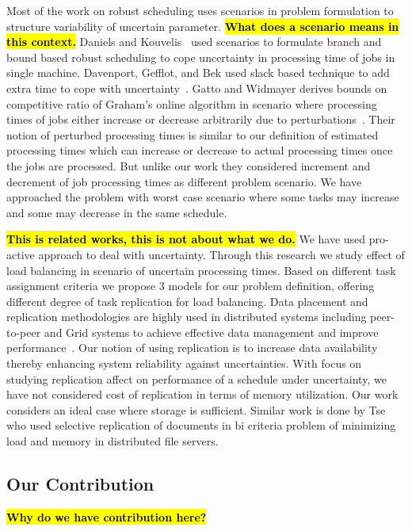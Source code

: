 \documentclass[10pt, conference, compsocconf]{IEEEtran}
\newcommand{\todo}[1]{{\color{red}\textbf{\hl{#1}}\xspace}}
\begin{document}
Most of the work on robust scheduling uses scenarios in problem
formulation to structure variability of uncertain parameter. \todo{What does a scenario means in this context.} Daniels and Kouvelis~\cite{citeulike:8334169} used scenarios to formulate
branch and bound based robust scheduling to cope uncertainty in
processing time of jobs in single machine. Davenport, Gefflot, and Bek
used slack based technique to add extra time to cope with
uncertainty~\cite{Davenport_slack-basedtechniques}. Gatto and Widmayer
derives bounds on competitive ratio of Graham’s online algorithm in
scenario where processing times of jobs either increase or decrease
arbitrarily due to perturbations~\cite{Gatto07}.  Their notion of
perturbed processing times is similar to our definition of estimated
processing times which can increase or decrease to actual processing
times once the jobs are processed. But unlike our work they considered
increment and decrement of job processing times as different problem
scenario. We have approached the problem with worst case scenario
where some tasks may increase and some may decrease in the same
schedule.
  
\todo{This is related works, this is not about what we do.} We have
used pro-active approach to deal with uncertainty. Through this
research we study effect of load balancing in scenario of uncertain
processing times. Based on different task assignment criteria we
propose 3 models for our problem definition, offering different degree
of task replication for load balancing. Data placement and replication
methodologies are highly used in distributed systems including
peer-to-peer and Grid systems to achieve effective data management and
improve
performance~\cite{Cirne2007213}\cite{Abawajy}\cite{4215379}. Our
notion of using replication is to increase data availability thereby
enhancing system reliability against uncertainties. With focus on
studying replication affect on performance of a schedule under
uncertainty, we have not considered cost of replication in terms of
memory utilization. Our work considers an ideal case where storage is
sufficient.  Similar work is done by Tse~\cite{DBLP:journals/tc/Tse12}
who used selective replication of documents in bi criteria problem of
minimizing load and memory in distributed file servers.


\subsection{Our Contribution}

\todo{Why do we have contribution here?}
\end{document}
